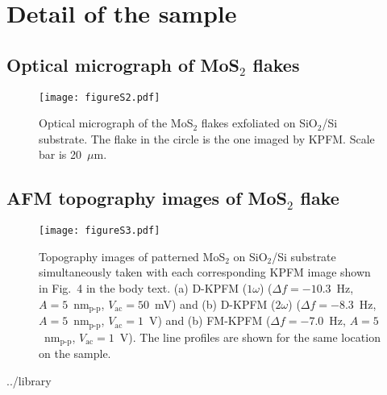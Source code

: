 \documentclass[preprint]{revtex4-1}
\newcommand{\Vac}{V_\mathrm{ac}}
\newcommand{\df}{\Delta f}
\begin{document}
\section{Detail of the sample}
\subsection{Optical micrograph of MoS$_2$ flakes}
\begin{figure}[h]
  \centering
  \texttt{[image: figureS2.pdf]}
  \caption{Optical micrograph of the MoS$_2$ flakes exfoliated on SiO$_2$/Si substrate. 
The flake in the circle is the one imaged by KPFM. Scale bar is 20~$\mu$m.
\label{fig:DKPFM_image}}
\end{figure}

\subsection{AFM topography images of MoS$_2$ flake}
\begin{figure}[h]
  \centering
  \texttt{[image: figureS3.pdf]}
  \caption{Topography images of patterned MoS$_2$ on SiO$_2$/Si substrate 
        simultaneously taken with each corresponding KPFM image shown in 
        Fig.~4 in the body text. 
        (a) D-KPFM ($1\omega$) ($\df = -10.3$~Hz, $A=5$~nm$_\text{p-p}$, 
        $\Vac=50$~mV) and 
        (b) D-KPFM ($2\omega$) ($\df = -8.3$~Hz, $A=5$~nm$_\text{p-p}$, 
        $\Vac=1$~V) and 
        (b) FM-KPFM ($\df = -7.0$~Hz, $A=5$~nm$_\text{p-p}$, 
        $\Vac=1$~V). 
        The line profiles are shown for the same location on the sample.
\label{fig:DKPFM_image}}
\end{figure}




 {../library}
\end{document}
